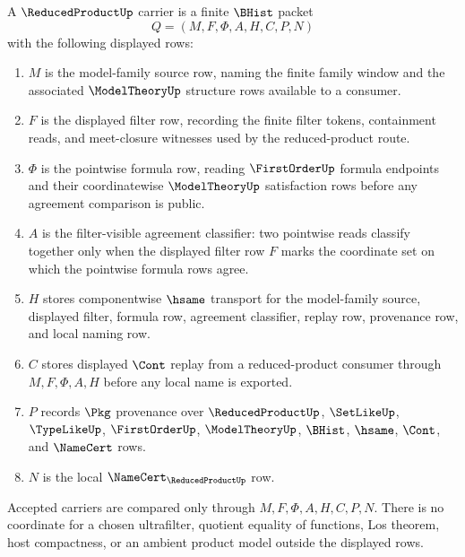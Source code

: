 \begin{definition}
\label{def:reduced-product-carrier}
A $\ReducedProductUp$ carrier is a finite $\BHist$ packet
$$
Q=(M,F,\Phi,A,H,C,P,N)
$$
with the following displayed rows:
\begin{enumerate}
\item $M$ is the model-family source row, naming the finite family window and the associated $\ModelTheoryUp$ structure rows available to a consumer.
\item $F$ is the displayed filter row, recording the finite filter tokens, containment reads, and meet-closure witnesses used by the reduced-product route.
\item $\Phi$ is the pointwise formula row, reading $\FirstOrderUp$ formula endpoints and their coordinatewise $\ModelTheoryUp$ satisfaction rows before any agreement comparison is public.
\item $A$ is the filter-visible agreement classifier: two pointwise reads classify together only when the displayed filter row $F$ marks the coordinate set on which the pointwise formula rows agree.
\item $H$ stores componentwise $\hsame$ transport for the model-family source, displayed filter, formula row, agreement classifier, replay row, provenance row, and local naming row.
\item $C$ stores displayed $\Cont$ replay from a reduced-product consumer through $M,F,\Phi,A,H$ before any local name is exported.
\item $P$ records $\Pkg$ provenance over $\ReducedProductUp$, $\SetLikeUp$, $\TypeLikeUp$, $\FirstOrderUp$, $\ModelTheoryUp$, $\BHist$, $\hsame$, $\Cont$, and $\NameCert$ rows.
\item $N$ is the local $\NameCert_{\ReducedProductUp}$ row.
\end{enumerate}
Accepted carriers are compared only through $M,F,\Phi,A,H,C,P,N$. There is no coordinate for a chosen ultrafilter, quotient equality of functions, Los theorem, host compactness, or an ambient product model outside the displayed rows.
\end{definition}

